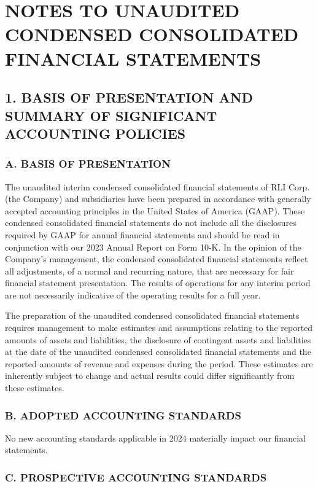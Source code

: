 \documentclass{article}
\begin{document}
\section*{NOTES TO UNAUDITED CONDENSED CONSOLIDATED FINANCIAL STATEMENTS}

\subsection*{1. BASIS OF PRESENTATION AND SUMMARY OF SIGNIFICANT ACCOUNTING POLICIES}

\subsubsection*{A. BASIS OF PRESENTATION}

The unaudited interim condensed consolidated financial statements of RLI Corp. (the Company) and subsidiaries have been prepared in accordance with generally accepted accounting principles in the United States of America (GAAP). These condensed consolidated financial statements do not include all the disclosures required by GAAP for annual financial statements and should be read in conjunction with our 2023 Annual Report on Form 10-K. In the opinion of the Company's management, the condensed consolidated financial statements reflect all adjustments, of a normal and recurring nature, that are necessary for fair financial statement presentation. The results of operations for any interim period are not necessarily indicative of the operating results for a full year.

The preparation of the unaudited condensed consolidated financial statements requires management to make estimates and assumptions relating to the reported amounts of assets and liabilities, the disclosure of contingent assets and liabilities at the date of the unaudited condensed consolidated financial statements and the reported amounts of revenue and expenses during the period. These estimates are inherently subject to change and actual results could differ significantly from these estimates.

\subsubsection*{B. ADOPTED ACCOUNTING STANDARDS}

No new accounting standards applicable in 2024 materially impact our financial statements.

\subsubsection*{C. PROSPECTIVE ACCOUNTING STANDARDS}
\end{document}
